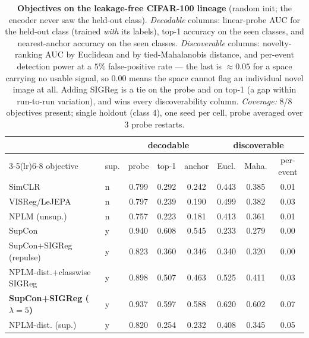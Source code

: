 \begin{table}[t]
\centering
\small
\begin{tabular}{llcccccc}
\toprule
& & \multicolumn{3}{c}{decodable} & \multicolumn{3}{c}{discoverable} \\
\cmidrule(lr){3-5}\cmidrule(lr){6-8}
objective & sup. & probe & top-1 & anchor & Eucl. & Maha. & per-event \\
\midrule
SimCLR & n & 0.799 & 0.292 & 0.242 & 0.443 & 0.385 & 0.01 \\
VISReg/LeJEPA & n & 0.797 & 0.239 & 0.190 & 0.499 & 0.382 & 0.03 \\
NPLM (unsup.) & n & 0.757 & 0.223 & 0.181 & 0.413 & 0.361 & 0.01 \\
SupCon & y & 0.940 & 0.608 & 0.545 & 0.233 & 0.279 & 0.00 \\
SupCon+SIGReg (repulse) & y & 0.823 & 0.360 & 0.346 & 0.340 & 0.320 & 0.00 \\
NPLM-dist.+classwise SIGReg & y & 0.898 & 0.507 & 0.463 & 0.525 & 0.411 & 0.03 \\
\textbf{SupCon+SIGReg ($\lambda{=}5$)} & y & 0.937 & 0.597 & 0.588 & 0.620 & 0.602 & 0.07 \\
NPLM-dist. (sup.) & y & 0.820 & 0.254 & 0.232 & 0.408 & 0.345 & 0.05 \\
\bottomrule
\end{tabular}
\caption{\textbf{Objectives on the leakage-free CIFAR-100 lineage} (random init; the encoder never saw the held-out class). \emph{Decodable} columns: linear-probe AUC for the held-out class (trained \emph{with} its labels), top-1 accuracy on the seen classes, and nearest-anchor accuracy on the seen classes. \emph{Discoverable} columns: novelty-ranking AUC by Euclidean and by tied-Mahalanobis distance, and per-event detection power at a $5\%$ false-positive rate --- the last is $\approx0.05$ for a space carrying no usable signal, so $0.00$ means the space cannot flag an individual novel image at all. Adding SIGReg is a tie on the probe and on top-1 (a gap within run-to-run variation), and wins every discoverability column. \emph{Coverage:} 8/8 objectives present; single holdout (class 4), one seed per cell, probe averaged over 3 probe restarts.}
\label{tab:objectives}
\end{table}
